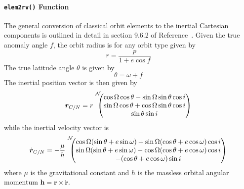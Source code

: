 \paragraph{{\tt elem2rv()} Function}
The general conversion of classical orbit elements to the inertial Cartesian components is outlined in detail in section 9.6.2 of Reference~.  Given the true anomaly angle $f$, the orbit radius is for any orbit type given by
\begin{equation}
	r = \frac{p}{1 + e \cos f}
\end{equation}
The true latitude angle $\theta$ is given by
\begin{equation}
	\theta = \omega + f
\end{equation}
The inertial position vector is then given by\cite{schaub}
\begin{equation}
\bm r_{C/N} =r {\begin{matrix} ~ \\ ~ \\ ~
\end{matrix}}^{\cal N}\!\!\!\!  \begin{pmatrix}
\cos\Omega\cos\theta 
- \sin\Omega\sin\theta\cos i \\ 
\sin\Omega\cos\theta + \cos\Omega\sin\theta\cos 
i \\
 \sin\theta\sin i 
 \end{pmatrix}
\label{eq:tb:r2}
\end{equation}
while the inertial velocity vector is
\begin{equation}
\dot{\bm r}_{C/N} = -\frac{\mu}{h}
{\begin{matrix} ~ \\ ~ \\ ~
\end{matrix}}^{\cal N}\!\!\!\!  \begin{pmatrix}
\cos\Omega (\sin\theta + e\sin\omega ) + \sin\Omega 
(\cos\theta+e\cos\omega )\cos i \\
\sin\Omega (\sin\theta + e\sin\omega ) - \cos\Omega ( \cos\theta 
+ e\cos\omega )\cos i \\
-(\cos\theta + e\cos\omega )\sin i
\end{pmatrix}
\label{eq:tb:dr2}
\end{equation}
where $\mu$ is the gravitational constant and $h$ is the massless orbital angular momentum $\bm h = \bm r \times \dot{\bm r}$.  


